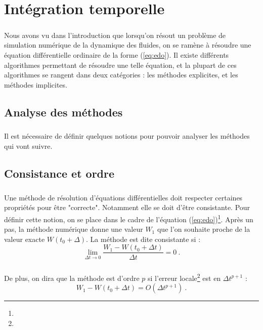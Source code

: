 \chapter{Intégration temporelle}

\paragraph{}
Nous avons vu dans l'introduction que lorsqu'on résout un problème de simulation numérique de la dynamique des fluides, on se ramène à résoudre une équation différentielle ordinaire de la forme (\ref{eq:edo}).
Il existe différents algorithmes permettant de résoudre une telle équation, et la plupart de ces algorithmes se rangent dans deux catégories : les méthodes explicites, et les méthodes implicites.

\section{Analyse des méthodes}

  \paragraph{}
  Il est nécessaire de définir quelques notions pour pouvoir analyser les méthodes qui vont suivre.

  \section{Consistance et ordre}

    \paragraph{}
    Une méthode de résolution d'équations différentielles doit respecter certaines propriétés pour être "correcte".
    Notamment elle se doit d'être consistante.
    Pour définir cette notion, on se place dans le cadre de l'équation (\ref{eq:edo})\footnote{}.
    Après un pas, la méthode numérique donne une valeur $W_1$ que l'on souhaite proche de la valeur exacte $W\left(t_0 + \Delta\right)$.
    La méthode est dite consistante si :
    \[\lim_{\Delta t \rightarrow 0} \frac{W_1 - W\left(t_0 + \Delta t\right)}{\Delta t} = 0\ .\]

    \paragraph{}
    De plus, on dira que la méthode est d'ordre $p$ si l'erreur locale\footnote{} est en $\Delta t^{p+1}$ :
    \[W_1 - W\left(t_0 + \Delta t\right) = O\left(\Delta t^{p+1}\right)\ .\]



